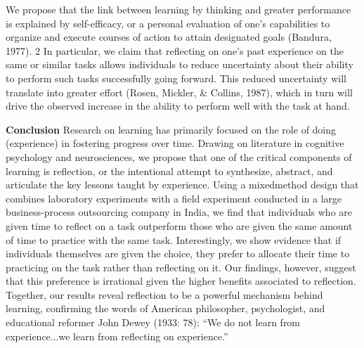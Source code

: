 We propose that the link between learning by thinking and greater performance is
explained by self-efficacy, or a personal evaluation of one’s capabilities to organize and execute
courses of action to attain designated goals (Bandura, 1977).
2 In particular, we claim that
reflecting on one’s past experience on the same or similar tasks allows individuals to reduce
uncertainty about their ability to perform such tasks successfully going forward. This reduced
uncertainty will translate into greater effort (Rosen, Mickler, \& Collins, 1987), which in turn will
drive the observed increase in the ability to perform well with the task at hand.

\textbf{Conclusion}
Research on learning has primarily focused on the role of doing (experience) in fostering
progress over time. Drawing on literature in cognitive psychology and neurosciences, we
propose that one of the critical components of learning is reflection, or the intentional attempt
to synthesize, abstract, and articulate the key lessons taught by experience. Using a mixedmethod
design that combines laboratory experiments with a field experiment conducted in a
large business-process outsourcing company in India, we find that individuals who are given time
to reflect on a task outperform those who are given the same amount of time to practice with
the same task. Interestingly, we show evidence that if individuals themselves are given the
choice, they prefer to allocate their time to practicing on the task rather than reflecting on it. Our
findings, however, suggest that this preference is irrational given the higher benefits associated to
reflection. Together, our results reveal reflection to be a powerful mechanism behind learning,
confirming the words of American philosopher, psychologist, and educational reformer John
Dewey (1933: 78): “We do not learn from experience...we learn from reflecting on experience.”